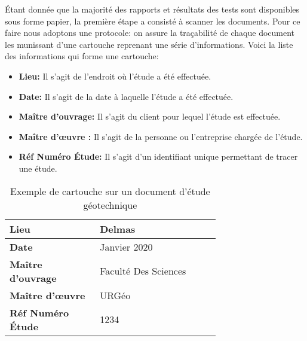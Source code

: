 

                \par
                Étant donnée que la majorité des rapports et résultats des tests sont 
                disponibles sous forme papier, la première étape a consisté à scanner les documents.
                Pour ce faire nous adoptons une protocole: on assure la traçabilité de chaque 
                document les munissant d'une cartouche reprenant une série d'informations.
                Voici la liste des informations qui forme une cartouche:
                \begin{itemize}
                        \item \textbf{Lieu: }
                        Il s'agit de l'endroit où l'étude a été effectuée.
                        \item \textbf{Date: }
                        Il s'agit de la date à laquelle l'étude a été effectuée.
                        \item \textbf{Maître d'ouvrage: }
                        Il s'agit du client pour lequel l'étude est effectuée.
                        \item \textbf{Maître d'œuvre : }
                        Il s'agit de la personne ou l'entreprise chargée de l'étude.
                        \item \textbf{Réf Numéro Étude: }
                        Il s'agit d'un identifiant unique permettant de tracer une étude.
                \end{itemize}
                
\par    
\begin{table} 
        \centering
        \begin{tabular}{|p{0.30\linewidth}|p{0.40\linewidth}|}
                \hline
                \textbf{Lieu} & Delmas \\
                \hline
                \textbf{Date} & Janvier 2020 \\
                \hline
                \textbf{Maître d'ouvrage} & Faculté Des Sciences \\
                \hline
                \textbf{Maître d'œuvre} & URGéo \\
                \hline
                \textbf{Réf Numéro Étude} & 1234 \\
                \hline
        \end{tabular}
        \caption{Exemple de cartouche sur un document d'étude géotechnique} \label{tab:example_cartouche}
\end{table}
\par
